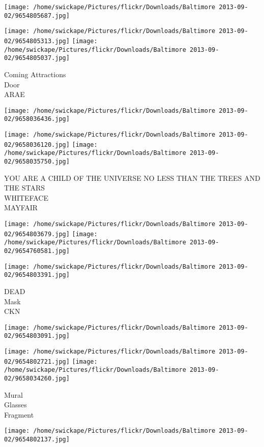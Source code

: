 \documentclass[10pt,letterpaper]{article}
\begin{document}
\texttt{[image: /home/swickape/Pictures/flickr/Downloads/Baltimore 2013-09-02/9654805687.jpg]}

\vspace{0.25in}
\texttt{[image: /home/swickape/Pictures/flickr/Downloads/Baltimore 2013-09-02/9654805313.jpg]}
\texttt{[image: /home/swickape/Pictures/flickr/Downloads/Baltimore 2013-09-02/9654805037.jpg]}

Coming Attractions\\
Door\\
ARAE
\pagebreak

\texttt{[image: /home/swickape/Pictures/flickr/Downloads/Baltimore 2013-09-02/9658036436.jpg]}

\vspace{0.25in}
\texttt{[image: /home/swickape/Pictures/flickr/Downloads/Baltimore 2013-09-02/9658036120.jpg]}
\texttt{[image: /home/swickape/Pictures/flickr/Downloads/Baltimore 2013-09-02/9658035750.jpg]}

YOU ARE A CHILD OF THE UNIVERSE NO LESS THAN THE TREES AND THE STARS\\
WHITEFACE\\
MAYFAIR
\pagebreak

\texttt{[image: /home/swickape/Pictures/flickr/Downloads/Baltimore 2013-09-02/9654803679.jpg]}
\texttt{[image: /home/swickape/Pictures/flickr/Downloads/Baltimore 2013-09-02/9654760581.jpg]}

\vspace{0.25in}
\texttt{[image: /home/swickape/Pictures/flickr/Downloads/Baltimore 2013-09-02/9654803391.jpg]}

DEAD\\
Mask\\
CKN
\pagebreak

\texttt{[image: /home/swickape/Pictures/flickr/Downloads/Baltimore 2013-09-02/9654803091.jpg]}

\vspace{0.25in}
\texttt{[image: /home/swickape/Pictures/flickr/Downloads/Baltimore 2013-09-02/9654802721.jpg]}
\texttt{[image: /home/swickape/Pictures/flickr/Downloads/Baltimore 2013-09-02/9658034260.jpg]}

Mural\\
Glasses\\
Fragment
\pagebreak

\texttt{[image: /home/swickape/Pictures/flickr/Downloads/Baltimore 2013-09-02/9654802137.jpg]}
\end{document}
